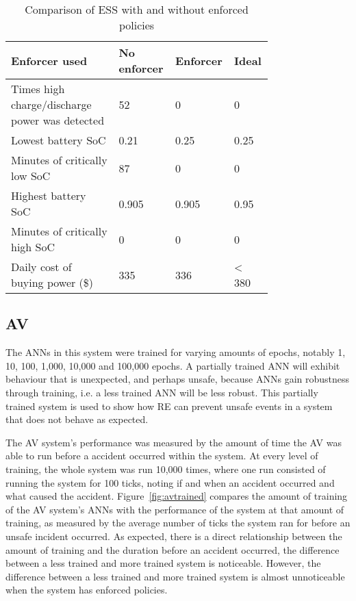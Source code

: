 \begin{table}[t]
	\centering
	\caption{Comparison of ESS with and without enforced policies}
	\label{table:essres}
	\begin{tabular}{|p{0.4\linewidth}|p{0.12\linewidth}|p{0.12\linewidth}|p{0.12\linewidth}|}
		\hline Enforcer used & No enforcer &  Enforcer & Ideal \\ \hline
		Times high charge/discharge power was detected & 52 & 0 & 0 \\ \hline      
		Lowest battery \ac{SoC} & 0.21 & 0.25 & 0.25 \\ \hline
		Minutes of critically low \ac{SoC} & 87 & 0 & 0 \\ \hline
		Highest battery \ac{SoC} & 0.905 & 0.905 & 0.95 \\ \hline
		Minutes of critically high \ac{SoC} & 0 & 0 & 0 \\ \hline
		Daily cost of buying power (\$) & 335 & 336 & < 380 \\ \hline 
	\end{tabular}
\end{table}

\subsection{\acf{AV}}
The \acp{ANN} in this system were trained for varying amounts of epochs, notably 1, 10, 100, 1,000, 10,000 and 100,000 epochs.
A partially trained \ac{ANN} will exhibit behaviour that is unexpected, and perhaps unsafe, because \acp{ANN} gain robustness through training, i.e. a less trained \ac{ANN} will be less robust.
This partially trained system is used to show how \ac{RE} can prevent unsafe events in a system that does not behave as expected.

The \ac{AV} system's performance was measured by the amount of time the \ac{AV} was able to run before a accident occurred within the system.
At every level of training, the whole system was run 10,000 times, where one run consisted of running the system for 100 ticks, noting if and when an accident occurred and what caused the accident. 
Figure~\ref{fig:avtrained} compares the amount of training of the \ac{AV} system's \acp{ANN} with the performance of the system at that amount of training, as measured by the average number of ticks the system ran for before an unsafe incident occurred.
As expected, there is a direct relationship between the amount of training and the duration before an accident occurred, the difference between a less trained and more trained system is noticeable.
However, the difference between a less trained and more trained system is almost unnoticeable when the system has enforced policies. 

